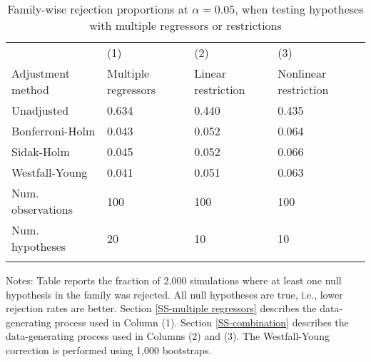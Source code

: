 \documentclass{article}
\begin{document}
\begin{table}[tbp] \centering
{}

\caption{Family-wise rejection proportions at \(\alpha = 0.05\), when testing hypotheses with multiple regressors or restrictions}
\label{tab:wyoung3}
\begin{tabularx}{\textwidth}{lCCC}

\toprule
&{(1)}&{(2)}&{(3)} \tabularnewline
{Adjustment method}&{Multiple regressors}&{Linear restriction}&{Nonlinear restriction} \tabularnewline
\midrule\addlinespace[1.5ex]
Unadjusted&0.634&0.440&0.435 \tabularnewline
Bonferroni-Holm&0.043&0.052&0.064 \tabularnewline
Sidak-Holm&0.045&0.052&0.066 \tabularnewline
Westfall-Young&0.041&0.051&0.063 \tabularnewline
\midrule Num. observations&100&100&100 \tabularnewline
Num. hypotheses&20&10&10 \tabularnewline
\bottomrule \addlinespace[1.5ex]

\end{tabularx}
\begin{flushleft}
\footnotesize Notes: Table reports the fraction of 2,000 simulations where at least one null hypothesis in the family was rejected. All null hypotheses are true, i.e., lower rejection rates are better. Section \ref{SS-multiple regressors} describes the data-generating process used in Column (1). Section \ref{SS-combination} describes the data-generating process used in Columns (2) and (3). The Westfall-Young correction is performed using 1,000 bootstraps.
\end{flushleft}
\end{table}
\end{document}

